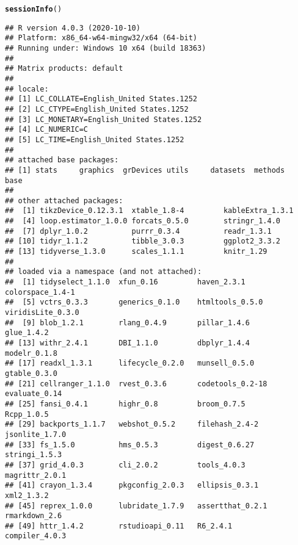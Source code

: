 \documentclass[12pt]{article}\usepackage[]{graphicx}\usepackage[]{color}
\makeatletter
\newcommand{\hlstd}[1]{\textcolor[rgb]{0.345,0.345,0.345}{#1}}%
\newcommand{\hlkwd}[1]{\textcolor[rgb]{0.737,0.353,0.396}{\textbf{#1}}}%
\newenvironment{kframe}{%
 \def\at@end@of@kframe{}%
 \ifinner\ifhmode%
  \def\at@end@of@kframe{\end{minipage}}%
  \begin{minipage}{\columnwidth}%
 \fi\fi%
 \def\FrameCommand##1{\hskip\@totalleftmargin \hskip-\fboxsep
 \colorbox{shadecolor}{##1}\hskip-\fboxsep
     \hskip-\linewidth \hskip-\@totalleftmargin \hskip\columnwidth}%
 \MakeFramed {\advance\hsize-\width
   \@totalleftmargin\z@ \linewidth\hsize
   \@setminipage}}%
 {\par\unskip\endMakeFramed%
 \at@end@of@kframe}
\newenvironment{knitrout}{}{} %
\makeatother
\begin{document}
\begin{knitrout}
\color{fgcolor}\begin{kframe}
\begin{alltt}
\hlkwd{sessionInfo}\hlstd{()}
\end{alltt}
\begin{verbatim}
## R version 4.0.3 (2020-10-10)
## Platform: x86_64-w64-mingw32/x64 (64-bit)
## Running under: Windows 10 x64 (build 18363)
## 
## Matrix products: default
## 
## locale:
## [1] LC_COLLATE=English_United States.1252 
## [2] LC_CTYPE=English_United States.1252   
## [3] LC_MONETARY=English_United States.1252
## [4] LC_NUMERIC=C                          
## [5] LC_TIME=English_United States.1252    
## 
## attached base packages:
## [1] stats     graphics  grDevices utils     datasets  methods   base     
## 
## other attached packages:
##  [1] tikzDevice_0.12.3.1  xtable_1.8-4         kableExtra_1.3.1    
##  [4] loop.estimator_1.0.0 forcats_0.5.0        stringr_1.4.0       
##  [7] dplyr_1.0.2          purrr_0.3.4          readr_1.3.1         
## [10] tidyr_1.1.2          tibble_3.0.3         ggplot2_3.3.2       
## [13] tidyverse_1.3.0      scales_1.1.1         knitr_1.29          
## 
## loaded via a namespace (and not attached):
##  [1] tidyselect_1.1.0  xfun_0.16         haven_2.3.1       colorspace_1.4-1 
##  [5] vctrs_0.3.3       generics_0.1.0    htmltools_0.5.0   viridisLite_0.3.0
##  [9] blob_1.2.1        rlang_0.4.9       pillar_1.4.6      glue_1.4.2       
## [13] withr_2.4.1       DBI_1.1.0         dbplyr_1.4.4      modelr_0.1.8     
## [17] readxl_1.3.1      lifecycle_0.2.0   munsell_0.5.0     gtable_0.3.0     
## [21] cellranger_1.1.0  rvest_0.3.6       codetools_0.2-18  evaluate_0.14    
## [25] fansi_0.4.1       highr_0.8         broom_0.7.5       Rcpp_1.0.5       
## [29] backports_1.1.7   webshot_0.5.2     filehash_2.4-2    jsonlite_1.7.0   
## [33] fs_1.5.0          hms_0.5.3         digest_0.6.27     stringi_1.5.3    
## [37] grid_4.0.3        cli_2.0.2         tools_4.0.3       magrittr_2.0.1   
## [41] crayon_1.3.4      pkgconfig_2.0.3   ellipsis_0.3.1    xml2_1.3.2       
## [45] reprex_1.0.0      lubridate_1.7.9   assertthat_0.2.1  rmarkdown_2.6    
## [49] httr_1.4.2        rstudioapi_0.11   R6_2.4.1          compiler_4.0.3
\end{verbatim}
\end{kframe}
\end{knitrout}
\end{document}
